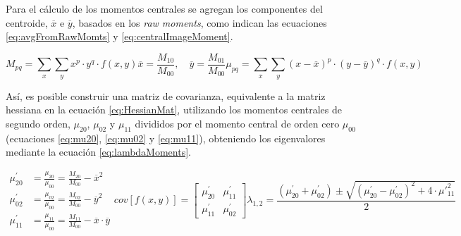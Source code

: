 Para el c\'alculo de los momentos centrales se agregan los componentes del centroide, $\overline{x}$ e $\overline{y}$, basados en los {\it raw moments}, como indican las ecuaciones \eqref{eq:avgFromRawMomts} y \eqref{eq:centralImageMoment}.

\begin{subequations}
\begin{equation}
    \label{eq:rawImageMoment}
    M_{pq} = \sum\limits_{x} \sum\limits_{y} x^p \cdot y^q \cdot f(x,y)
\end{equation}
\begin{equation}
    \label{eq:avgFromRawMomts}
    \overline{x} = \frac{M_{10}}{M_{00}}, \quad
    \overline{y} = \frac{M_{01}}{M_{00}}
\end{equation}
\begin{equation}
    \label{eq:centralImageMoment}
    \mu_{pq} = \sum\limits_{x} \sum\limits_{y} (x - \overline{x})^{p} \cdot (y - \overline{y})^{q} \cdot f(x,y)
\end{equation}
\end{subequations}

As\'i, es posible construir una matriz de covarianza, equivalente a la matriz hessiana en la ecuaci\'on \eqref{eq:HessianMat}, utilizando los momentos centrales de segundo orden, $\mu_{20}$, $\mu_{02}$ y $\mu_{11}$ divididos por el momento central de orden cero $\mu_{00}$ (ecuaciones \eqref{eq:mu20}, \eqref{eq:mu02} y \eqref{eq:mu11}), obteniendo los eigenvalores mediante la ecuaci\'on \eqref{eq:lambdaMoments}.

\begin{subequations}
\begin{align}
    \mu_{20}^{\prime} &= \frac{\mu_{20}}{\mu_{00}} = \frac{M_{20}}{M_{00}} - \overline{x}^{2} \label{eq:mu20} \\
    \mu_{02}^{\prime} &= \frac{\mu_{02}}{\mu_{00}} = \frac{M_{02}}{M_{00}} - \overline{y}^{2} \label{eq:mu02} \\
    \mu_{11}^{\prime} &= \frac{\mu_{11}}{\mu_{00}} = \frac{M_{11}}{M_{00}} - \overline{x}\cdot\overline{y} \label{eq:mu11}
\end{align}

\begin{equation}
    \label{eq:covMatLambda}
    cov[f(x,y)] = \begin{bmatrix}
        \mu_{20}^{\prime} & \mu_{11}^{\prime} \\
        \mu_{11}^{\prime} & \mu_{02}^{\prime} 
        \end{bmatrix}
\end{equation}

\begin{equation}
    \label{eq:lambdaMoments}
    \lambda_{1,2} = \dfrac{(\mu_{20}^{\prime} + \mu_{02}^{\prime}) \pm \sqrt{(\mu_{20}^{\prime} - \mu_{02}^{\prime})^{2} + 4\cdot \mu\prime_{11}^{2} }}{2}
\end{equation}
\end{subequations}

